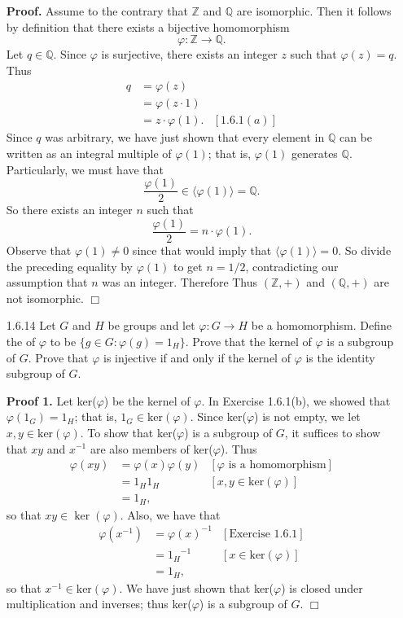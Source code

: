 \documentclass[9pt]{article}
\newcommand{\qed}{\hfill \ensuremath{\Box}}
\newcommand{\cyc}[1]{\langle #1 \rangle}
\newcommand{\Z}{\mathbb{Z}}
\newcommand{\Q}{\mathbb{Q}}
\begin{document}
\begin{enumerate}
      \textbf{Proof.} Assume to the contrary that $\Z$ and $\Q$ are isomorphic.
      Then it follows by definition that there exists a bijective homomorphism
      $$\varphi : \Z \rightarrow \Q.$$
      Let $q \in \Q$. Since $\varphi$ is surjective, there exists an integer $z$
      such that $\varphi(z) = q$. Thus
      \begin{align*}
         q &= \varphi(z) \\
           &= \varphi(z \cdot 1) \\
           &= z \cdot \varphi(1).  &[1.6.1(a)]
      \end{align*}
      Since $q$ was arbitrary, we have just shown that every element in $\Q$ can
      be written as an integral multiple of $\varphi(1)$; that is, $\varphi(1)$
      generates $\Q$. Particularly, we must have that
      $$\frac{\varphi(1)}{2} \in \cyc{\varphi(1)} = \Q.$$
      So there exists an integer $n$ such that
      $$\frac{\varphi(1)}{2} = n \cdot \varphi(1).$$
      Observe that $\varphi(1) \neq 0$ since that would imply that
      $\cyc{\varphi(1)} = 0$. So divide the preceding equality by $\varphi(1)$
      to get $n = 1/2$, contradicting our assumption that $n$ was an integer.
      Therefore Thus $(\Z, +)$ and $(\Q, +)$ are not isomorphic. \qed
   \item[1.6.14]  Let $G$ and $H$ be groups and let $\varphi : G \rightarrow H$
                  be a homomorphism. Define the  of $\varphi$ to be
                  $\{g \in G : \varphi(g) = 1_H\}$. Prove that the kernel of
                  $\varphi$ is a subgroup of $G$. Prove that $\varphi$ is
                  injective if and only if the kernel of $\varphi$ is the
                  identity subgroup of $G$.

      \textbf{Proof 1.} Let ker($\varphi$) be the kernel of $\varphi$. In
      Exercise 1.6.1(b), we showed that ${\varphi(1_G) = 1_H}$; that is,
      $1_G  \in \text{ker}(\varphi)$. Since ker($\varphi$) is not empty, we let
      $x, y \in \text{ker}(\varphi)$. To show that ker($\varphi$) is a subgroup
      of $G$, it suffices to show that $xy$ and $x^{-1}$ are also members of
      ker($\varphi$). Thus
      \begin{align*}
         \varphi(xy) &= \varphi(x)\varphi(y)
            &[\varphi \text{ is a homomorphism}] \\
            &= 1_H1_H &[x, y \in \text{ker}(\varphi)] \\
            &= 1_H,
      \end{align*}
      so that $xy \in \ker(\varphi)$. Also, we have that      
      \begin{align*}
         \varphi(x^{-1}) &= \varphi(x)^{-1} &[\text{Exercise }1.6.1] \\
            &= {1_H}^{-1} &[x \in \text{ker}(\varphi)] \\
            &= 1_H,
      \end{align*}
      so that $x^{-1} \in \text{ker}(\varphi)$. We have just shown that
      ker($\varphi$) is closed under multiplication and inverses; thus
      ker($\varphi$) is a subgroup of $G$. \qed


\end{enumerate}
\end{document}
